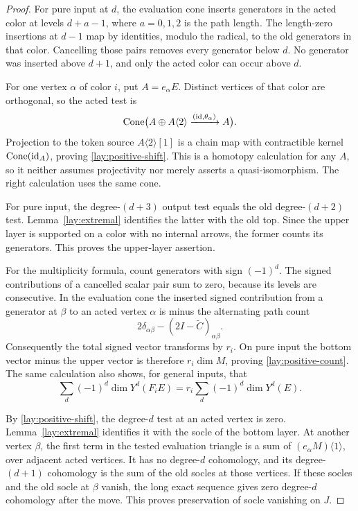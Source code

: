 \begin{proof}
For pure input at $d$, the evaluation cone inserts generators in the
acted color at levels $d+a-1$, where $a=0,1,2$ is the path length.
The length-zero insertions at $d-1$ map by identities, modulo the
radical, to the old generators in that color.  Cancelling those pairs
removes every generator below $d$.  No generator was inserted above
$d+1$, and only the acted color can occur above $d$.

For one vertex $\alpha$ of color $i$, put $A=e_\alpha E$.
Distinct vertices of that color are orthogonal, so the acted test is
\begin{equation}
 \operatorname{Cone}\bigl(A\oplus A\langle2\rangle
          \xrightarrow{(\mathrm{id},\theta_\alpha)} A\bigr).
 \label{lay:token-cone}
\end{equation}
Projection to the token source $A\langle2\rangle[1]$ is a chain map
with contractible kernel $\operatorname{Cone}(\mathrm{id}_A)$, proving
\eqref{lay:positive-shift}.  This is a homotopy calculation for any
$A$, so it neither assumes projectivity nor merely asserts a
quasi-isomorphism.  The right calculation uses the same cone.

For pure input, the degree-$(d+3)$ output test equals the old
degree-$(d+2)$ test.  Lemma~\ref{lay:extremal} identifies the latter
with the old top.  Since the upper layer is supported on a color with
no internal arrows, the former counts its generators.  This proves
the upper-layer assertion.

For the multiplicity formula, count generators with sign $(-1)^d$.
The signed contributions of a cancelled scalar pair sum to zero,
because its levels are consecutive.  In the evaluation cone the
inserted signed contribution from a generator at $\beta$ to an acted
vertex $\alpha$ is minus the alternating path count
\[
 2\delta_{\alpha\beta}-(2I-\widetilde C)_{\alpha\beta}.
\]
Consequently the total signed vector transforms by $r_i$.  On pure
input the bottom vector minus the upper vector is therefore
$r_i\dim M$, proving \eqref{lay:positive-count}.  The same calculation
also shows, for general inputs, that
\begin{equation}
 \sum_d(-1)^d\dim Y^d(F_iE)
       =r_i\sum_d(-1)^d\dim Y^d(E).
 \label{lay:signed-reflection}
\end{equation}

By \eqref{lay:positive-shift}, the degree-$d$ test at an acted vertex
is zero.  Lemma~\ref{lay:extremal} identifies it with the socle of
the bottom layer.  At another vertex $\beta$, the first term in the
tested evaluation triangle is a sum of
$(e_\alpha M)\langle1\rangle$, over adjacent acted vertices.
It has no degree-$d$ cohomology, and its degree-$(d+1)$ cohomology
is the sum of the old socles at those vertices.  If these socles and
the old socle at $\beta$ vanish, the long exact sequence gives zero
degree-$d$ cohomology after the move.  This proves preservation of
socle vanishing on $J$.
\end{proof}

